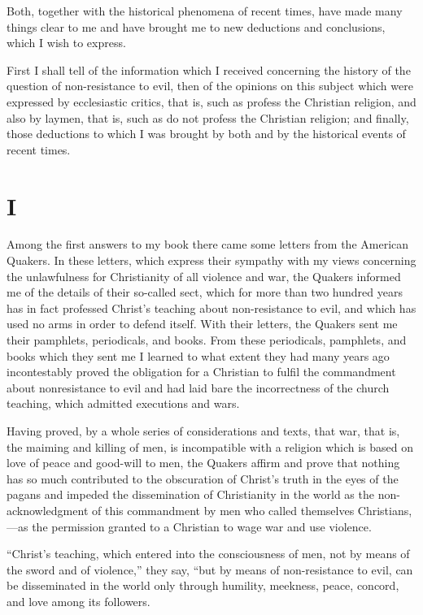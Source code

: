\documentclass{book}
\begin{document}
Both, together with the historical phenomena of recent times, have made many things clear to me and have brought me to new deductions and conclusions, which I wish to express.

First I shall tell of the information which I received concerning the history of the question of non-resistance to evil, then of the opinions on this subject which were expressed by ecclesiastic critics, that is, such as profess the Christian religion, and also by laymen, that is, such as do not profess the Christian religion; and finally, those deductions to which I was brought by both and by the historical events of recent times.

\chapter*{I}
\label{chapter-1}
Among the first answers to my book there came some letters from the American Quakers. In these letters, which express their sympathy with my views concerning the unlawfulness for Christianity of all violence and war, the Quakers informed me of the details of their so-called sect, which for more than two hundred years has in fact professed Christ’s teaching about non-resistance to evil, and which has used no arms in order to defend itself. With their letters, the Quakers sent me their pamphlets, periodicals, and books. From these periodicals, pamphlets, and books which they sent me I learned to what extent they had many years ago incontestably proved the obligation for a Christian to fulfil the commandment about nonresistance to evil and had laid bare the incorrectness of the church teaching, which admitted executions and wars.

Having proved, by a whole series of considerations and texts, that war, that is, the maiming and killing of men, is incompatible with a religion which is based on love of peace and good-will to men, the Quakers affirm and prove that nothing has so much contributed to the obscuration of Christ’s truth in the eyes of the pagans and impeded the dissemination of Christianity in the world as the non-acknowledgment of this commandment by men who called themselves Christians,—as the permission granted to a Christian to wage war and use violence.

“Christ’s teaching, which entered into the consciousness of men, not by means of the sword and of violence,” they say, “but by means of non-resistance to evil, can be disseminated in the world only through humility, meekness, peace, concord, and love among its followers.
\end{document}
